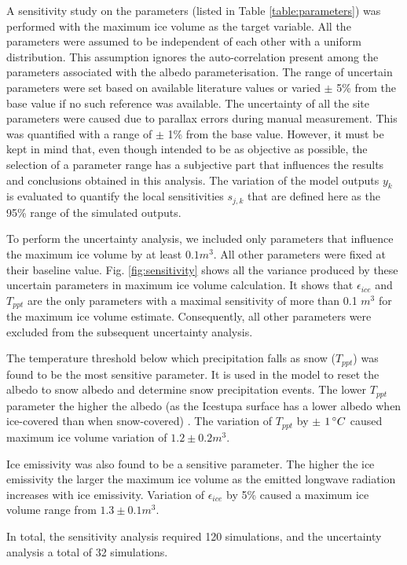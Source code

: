 \documentclass[utf8]{frontiersSCNS} %
\begin{document}
A sensitivity study on the parameters (listed in Table \ref{table:parameters}) was performed with the maximum ice
volume as the target variable. All the parameters were assumed to be independent of each other with a uniform
distribution.  This assumption ignores the auto-correlation present among the parameters associated with the albedo
parameterisation.  The range of uncertain parameters were set based on available literature values or varied $\pm$ 5\%
from the base value if no such reference was available. The uncertainty of all the site parameters were caused due to
parallax errors during manual measurement. This was quantified with a range of $\pm$ 1\% from the base value. However,
it must be kept in mind that, even though intended to be as objective as possible, the selection of a parameter range
has a subjective part that influences the results and conclusions obtained in this analysis.  The variation of the
model outputs $y_k$ is evaluated to quantify the local sensitivities $s_{j,k}$ that are defined here as the 95\% range
of the simulated outputs.

To perform the uncertainty analysis, we included only parameters that influence the maximum ice volume by at least $0.1
m^3$. All other parameters were fixed at their baseline value.  Fig. \ref{fig:sensitivity} shows all the variance
produced by these uncertain parameters in maximum ice volume calculation. It shows that $\epsilon_{ice}$ and $T_{ppt}$
are the only parameters with a maximal sensitivity of more than 0.1 $m^3$ for the maximum ice volume estimate.
Consequently, all other parameters were excluded from the subsequent uncertainty analysis. 

The temperature threshold below which precipitation falls as snow ($T_{ppt}$) was found to be the most sensitive
parameter. It is used in the model to reset the albedo to snow albedo and determine snow precipitation events. The
lower $T_{ppt}$ parameter the higher the albedo (as the Icestupa surface has a lower albedo when ice-covered than when
snow-covered) . The variation of $T_{ppt}$ by $\pm$ $1\,\degree C$ caused maximum ice volume variation of $1.2 \pm 0.2
m^3$. 

Ice emissivity was also found to be a sensitive parameter. The higher the ice emissivity the larger the maximum ice
volume as the emitted longwave radiation increases with ice emissivity. Variation of $\epsilon_{ice}$ by 5\% caused a
maximum ice volume range from $1.3 \pm 0.1 m^3$. 

In total, the sensitivity analysis required 120 simulations, and the uncertainty analysis a total of 32 simulations.
\end{document}
